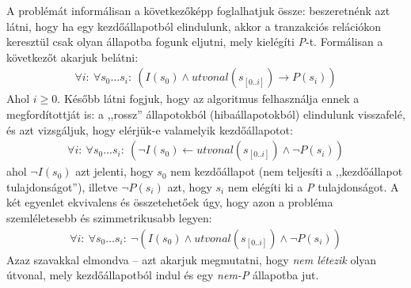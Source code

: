 A problémát informálisan a következőképp foglalhatjuk össze: beszeretnénk azt látni, hogy ha egy kezdőállapotból elindulunk, akkor a tranzakciós relációkon keresztül csak olyan állapotba fogunk eljutni, mely kielégíti \emph{P}-t. Formálisan a következőt akarjuk belátni:
\begin{align}
	\forall i:~\forall s_{0} \dots s_{i}:~(I(s_{0}) \wedge utvonal(s_{[0..i]}) \rightarrow P(s_{i}))
\end{align}
Ahol $i \geq 0$. Később látni fogjuk, hogy az algoritmus felhasználja ennek a megfordítottját is: a ,,rossz'' állapotokból (hibaállapotokból) elindulunk visszafelé, és azt vizsgáljuk, hogy elérjük-e valamelyik kezdőállapotot:
\begin{align}
	\forall i:~\forall s_{0} \dots s_{i}:~(\neg I(s_{0}) \leftarrow utvonal(s_{[0..i]}) \wedge \neg P(s_{i}))
\end{align}
ahol $\neg I(s_{0})$ azt jelenti, hogy $s_{0}$ nem kezdőállapot (nem teljesíti a ,,kezdőállapot tulajdonságot''), illetve $\neg P(s_{i})$ azt, hogy $s_{i}$ nem elégíti ki a \emph{P} tulajdonságot. A két egyenlet ekvivalens és összetehetőek úgy, hogy azon a probléma szemléletesebb és szimmetrikusabb legyen:
\begin{align}
	\forall i:~\forall s_{0} \dots s_{i}:~\neg(I(s_{0}) \wedge utvonal(s_{[0..i]}) \wedge \neg P(s_{i}))
\end{align}
Azaz szavakkal elmondva -- azt akarjuk megmutatni, hogy \emph{nem létezik} olyan útvonal, mely kezdőállapotból indul és egy \emph{nem-P} állapotba jut.